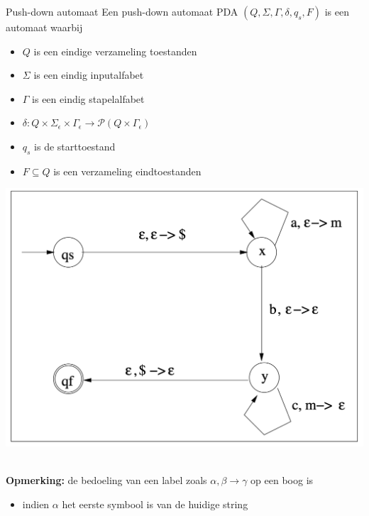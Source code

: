 \begin{theo}{Push-down automaat}
    Een push-down automaat PDA $(Q,\Sigma,\Gamma,\delta,q_s,F)$ is een automaat waarbij

    \vspace{0.2cm}
    \begin{minipage}{.6\textwidth}
        \begin{itemize}
            \item $Q$ is een eindige verzameling toestanden
            \item $\Sigma$ is een eindig inputalfabet
            \item $\Gamma$ is een eindig stapelalfabet
            \item $\delta: Q \times \Sigma_{\epsilon} \times \Gamma_{\epsilon} \to \mathcal{P}(Q \times \Gamma_{\epsilon})$
            \item $q_s$ is de starttoestand
            \item $F \subseteq Q$ is een verzameling eindtoestanden
        \end{itemize}
    \end{minipage}
    \begin{minipage}{.36\textwidth}
        \includegraphics[scale = 0.22]{Images/PDA.png}
    \end{minipage}
    \vspace{0.5cm} \\
    \textbf{Opmerking:} de bedoeling van een label zoals $\alpha, \beta \to \gamma$ op een boog is 
    \begin{itemize}
        \item indien $\alpha$ het eerste symbool is van de huidige string

\end{itemize}
\end{theo}
